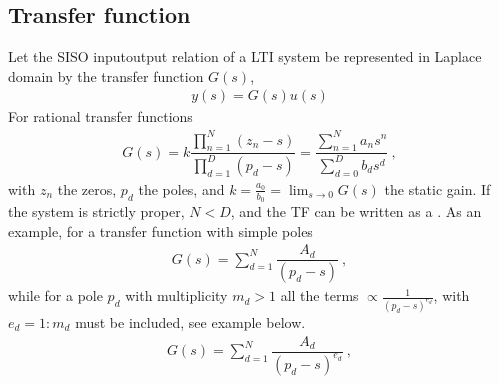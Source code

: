 \documentclass[letterpaper,10pt,english]{jupyterBook}
\begin{document}
\subsection{Transfer function}
\label{\detokenize{ch/system-theory/lti-stability-and-feedback:transfer-function}}\label{\detokenize{ch/system-theory/lti-stability-and-feedback:ode-lti-stability-fb-siso-tf}}
\sphinxAtStartPar
Let the SISO input\sphinxhyphen{}output relation of a LTI system be represented in Laplace domain by the transfer function \(G(s)\),
\begin{equation*}
\begin{split}y(s) = G(s) u(s)\end{split}
\end{equation*}
\sphinxAtStartPar
For rational transfer functions
\begin{equation*}
\begin{split}G(s) = k \dfrac{\prod_{n=1}^N (z_n - s)}{\prod_{d=1}^{D} (p_d - s)}  = \dfrac{\sum_{n=1}^{N} a_n s^n}{\sum_{d=0}^{D} b_d s^d} \ ,\end{split}
\end{equation*}
\sphinxAtStartPar
with \(z_n\) the zeros, \(p_d\) the poles, and \(k = \frac{a_0}{b_0} = \lim_{s \rightarrow 0} G(s)\) the static gain. If the system is strictly proper, \(N < D\), and the TF can be written as a . As an example, for a transfer function with simple poles
\begin{equation*}
\begin{split}G(s) = \sum_{d=1}^{N} \dfrac{A_d}{(p_d-s)} \ , \end{split}
\end{equation*}
\sphinxAtStartPar
while for a pole \(p_d\) with multiplicity \(m_d> 1\) all the terms \(\propto \frac{1}{(p_d-s)^{e_d}}\), with \(e_d = 1:m_d\) must be included, see example below.
\begin{equation*}
\begin{split}G(s) = \sum_{d=1}^{N} \dfrac{A_d}{(p_d-s)^{e_d}} \ , \end{split}
\end{equation*}\label{ch/system-theory/lti-stability-and-feedback:example-0}
\end{document}
